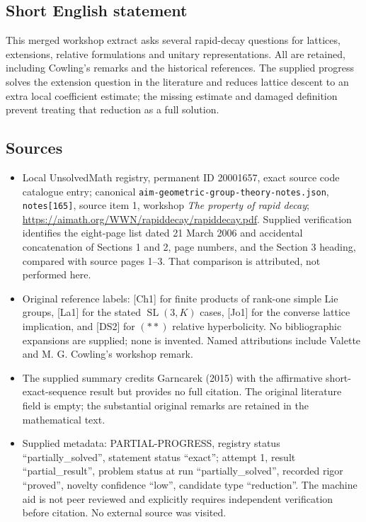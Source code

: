\documentclass[11pt]{article}
\begin{document}
\subsection{Short English statement}
This merged workshop extract asks several rapid-decay questions for lattices, extensions, relative formulations and unitary representations. All are retained, including Cowling's remarks and the historical references. The supplied progress solves the extension question in the literature and reduces lattice descent to an extra local coefficient estimate; the missing estimate and damaged definition prevent treating that reduction as a full solution.
\subsection{Sources}
\begin{itemize}
\item Local UnsolvedMath registry, permanent ID 20001657, exact source code catalogue entry; canonical \texttt{aim-geometric-group-theory-notes.json}, \texttt{notes[165]}, source item 1, workshop \emph{The property of rapid decay}; \url{https://aimath.org/WWN/rapiddecay/rapiddecay.pdf}. Supplied verification identifies the eight-page list dated 21 March 2006 and accidental concatenation of Sections 1 and 2, page numbers, and the Section 3 heading, compared with source pages 1--3. That comparison is attributed, not performed here.
\item Original reference labels: [Ch1] for finite products of rank-one simple Lie groups, [La1] for the stated $\operatorname{SL}(3,K)$ cases, [Jo1] for the converse lattice implication, and [DS2] for $(**)$ relative hyperbolicity. No bibliographic expansions are supplied; none is invented. Named attributions include Valette and M. G. Cowling's workshop remark.
\item The supplied summary credits Garncarek (2015) with the affirmative short-exact-sequence result but provides no full citation. The original literature field is empty; the substantial original remarks are retained in the mathematical text.
\item Supplied metadata: PARTIAL-PROGRESS, registry status ``partially\_solved'', statement status ``exact''; attempt 1, result ``partial\_result'', problem status at run ``partially\_solved'', recorded rigor ``proved'', novelty confidence ``low'', candidate type ``reduction''. The machine aid is not peer reviewed and explicitly requires independent verification before citation. No external source was visited.
\end{itemize}
\end{document}
